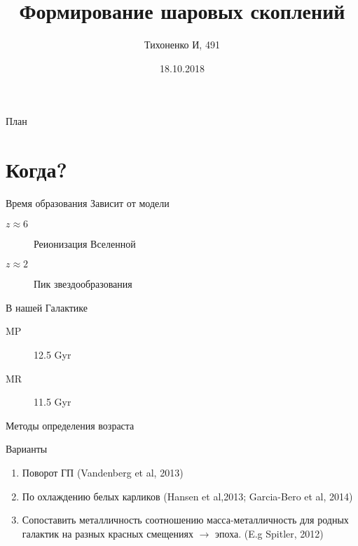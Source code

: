\documentclass{beamer}
\title{Формирование шаровых скоплений}
\author{Тихоненко И, 491}
\date{18.10.2018}
\begin{document}
\begin{frame}
  \titlepage
\end{frame}

\begin{frame}{План}
  \tableofcontents
\end{frame}

\section{Когда?}

\begin{frame}[wide]{Время образования}
    Зависит от модели
    
    \begin{description}
    \item[$z\approx 6$] Реионизация Вселенной
    \item[$z\approx 2$] Пик звездообразования
    \end{description}
    
    \begin{block}{В нашей Галактике}
        \begin{description}
        \item[MP] 12.5 Gyr
        \item[MR] 11.5 Gyr
        \end{description}
    \end{block}
\end{frame}

\begin{frame}[wide]{Методы определения возраста}
    \begin{block}{Варианты}
    \begin{enumerate}
        \item Поворот ГП (Vandenberg et al, 2013)
        \item По охлаждению белых карликов (Hansen et al,2013; Garcia-Bero et al, 2014)
        \item Сопоставить металличность 
        соотношению масса-металличность для родных галактик на разных
        красных смещениях $\to$ эпоха. (E.g Spitler, 2012)
    \end{enumerate}
    \end{block}
\end{frame}
\end{document}
